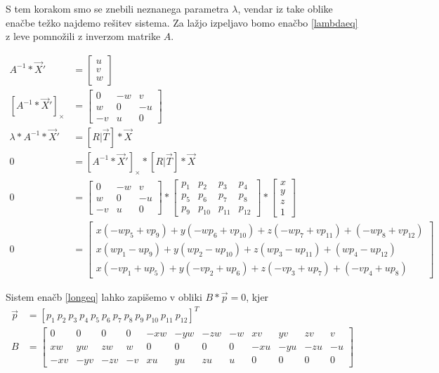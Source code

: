 \documentclass[a4paper, 12pt]{book}
\begin{document}
S tem korakom smo se znebili neznanega parametra $\lambda$, vendar iz take oblike enačbe težko najdemo rešitev sistema. Za lažjo izpeljavo bomo enačbo \eqref{lambdaeq} z leve pomnožili z inverzom matrike $A$.

\begin{align}
\label{uvw}
A^{-1} * \vec{X}' &=
\begin{bmatrix}
u \\
v \\
w
\end{bmatrix} \\
[A^{-1} * \vec{X}']_{\times} &=
\begin{bmatrix}
0 & -w & v \\
w & 0 & -u \\
-v & u & 0
\end{bmatrix} \\[5ex]
\lambda * A^{-1} * \vec{X}' &= [R | \vec{T}] * \vec{X} \\
0 &= [A^{-1} * \vec{X}']_{\times} * [R | \vec{T}] * \vec{X}\\
0 &= 
\begin{bmatrix}
0 & -w & v \\
w & 0 & -u \\
-v & u & 0
\end{bmatrix}
*
\begin{bmatrix}
p_1 & p_2 & p_3 & p_4 \\
p_5 & p_6 & p_7 & p_8 \\
p_9 & p_{10} & p_{11} & p_{12}
\end{bmatrix}
*
\begin{bmatrix}
x \\
y \\
z \\
1
\end{bmatrix} \\
0 &= 
\begin{bmatrix}
x(-wp_5 + vp_9) + y(-wp_6 + vp_{10}) + z(-wp_7 + vp_{11}) + (-wp_8 + vp_{12}) \\
x(wp_1 - up_9) + y(wp_2 - up_{10}) + z(wp_3 - up_{11}) + (wp_4 - up_{12}) \\
x(-vp_1 + up_5) + y(-vp_2 + up_6) + z(-vp_3 + up_7) + (-vp_4 + up_8)
\end{bmatrix}
\label{longeq}
\end{align}

\setcounter{MaxMatrixCols}{20}
Sistem enačb \eqref{longeq} lahko zapišemo v obliki $B * \vec{p} = 0$, kjer
\begin{align}
\vec{p} &= [p_1 \ p_2 \ p_3 \ p_4 \ p_5 \ p_6 \ p_7 \ p_8 \ p_9 \ p_{10} \ p_{11} \ p_{12}]^T \\
B &=
\begin{bmatrix}
0 & 0 & 0 & 0 & -xw & -yw & -zw & -w & xv & yv & zv & v \\
xw & yw & zw & w & 0 & 0 & 0 & 0 & -xu & -yu & -zu & -u \\
-xv & -yv & -zv & -v & xu & yu & zu & u & 0 & 0 & 0 & 0
\end{bmatrix}
\label{bmatrix}
\end{align}
\end{document}
